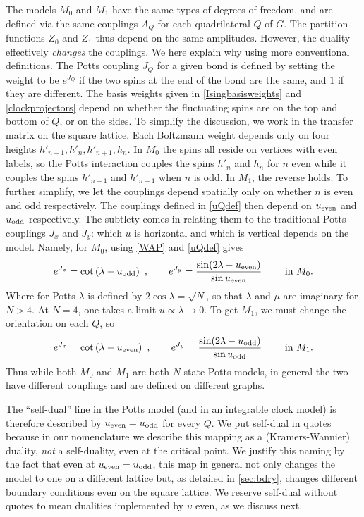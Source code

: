 The models ${M}_0$ and ${M}_1$ have the same types of degrees of freedom, and are defined via the {same} couplings $A_Q$ for each quadrilateral $Q$ of $G$. The partition functions $Z_0$ and ${Z}_1$ thus depend on the same amplitudes. However, the duality effectively {\em changes} the couplings. We here explain why using more conventional definitions. The Potts coupling $J_Q$ for a given bond is defined by setting the weight to be $e^{J_Q}$ if the two spins at the end of the bond are the same, and $1$ if they are different. The basis weights given in \eqref{Isingbasisweights} and  \eqref{clockprojectors} depend on whether the fluctuating spins are on the top and bottom of $Q$, or on the sides.  To simplify the discussion, we work in the transfer matrix on the square lattice. Each Boltzmann weight depends only on four heights $h'_{n-1}, h'_{n}, h'_{n+1}, h_{n}$. In ${M}_0$ the spins all reside on vertices with even labels, so the Potts interaction couples the spins $h'_{n}$ and $h_n$ for $n$ even while it couples the spins $h'_{n-1}$ and $h'_{n+1}$ when $n$ is odd. In ${M}_1$, the reverse holds. To further simplify, we let the couplings depend spatially only on whether $n$ is even and odd respectively.  The couplings defined in \eqref{uQdef} then depend on $u_{\rm even}$ and $u_{\rm odd}$ respectively.
The subtlety comes in relating them to the traditional Potts couplings $J_x$ and $J_y$: which $u$ is horizontal and which is vertical depends on the model. Namely, for $M_0$, using \eqref{WAP} and \eqref{uQdef} gives
\begin{align}
	e^{J_x} = \cot \left(\lambda-u_{\rm odd} \right)\ , \qquad  
	e^{J_y}=	\frac{\sin(2\lambda-u_{\rm even})}{\sin u_{\rm even} }\qquad\hbox{ in }M_0.
\label{Jxyu}
\end{align}
Where for Potts $\lambda$ is defined by $2\cos\lambda=\sqrt{N}$, so that $\lambda$ and $\mu$ are imaginary for $N>4$. At $N=4$, one takes a limit $u\propto\lambda\to 0$. 
To get $M_1$, we must change the orientation on each $Q$, so
\begin{align}
	e^{J_x} =	\cot\left(\lambda-u_{\rm even} \right)\ , \qquad e^{J_y} =\frac{\sin(2\lambda-u_{\rm odd})}{\sin u_{\rm odd} } \qquad\hbox{ in }M_1.
\label{Jxyu2}
\end{align}
Thus while both $M_0$ and $M_1$ are both $N$-state Potts models, in general the two have different couplings and are defined on different graphs. 


The ``self-dual'' line in the Potts model (and in an integrable clock model) is therefore described by $u_{\rm even}=u_{\rm odd}$ for every $Q$. We put self-dual in quotes because in our nomenclature we describe this mapping as a (Kramers-Wannier) duality, {\em not} a self-duality, even at the critical point. We justify this naming by the fact that even at $u_{\rm even}=u_{\rm odd}$, this map in general not only changes the model to one on a different lattice but, as detailed in \eqref{sec:bdry}, changes different boundary conditions even on the square lattice.  We reserve self-dual without quotes to mean dualities implemented by $\upsilon$ even, as we discuss next.




